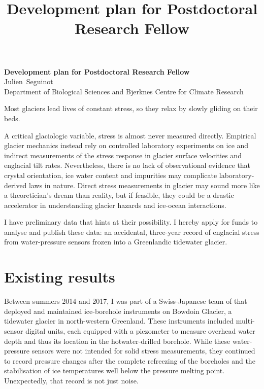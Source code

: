\documentclass{article}
\title{Development plan for Postdoctoral Research Fellow}
\begin{document}
\setlength{\parskip}{0.5\baselineskip}

    \begin{center}
      \textbf{Development plan for Postdoctoral Research Fellow}\\
      Julien~Seguinot \\
      Department of Biological Sciences and
      Bjerknes Centre for Climate Research
    \end{center}

    Most glaciers lead lives of constant stress, so they relax by slowly
    gliding on their beds.

    A critical glaciologic variable, stress is almost never measured directly.
    Empirical glacier mechanics instead rely on controlled laboratory
    experiments on ice and indirect measurements of the stress response in
    glacier surface velocities and englacial tilt rates. Nevertheless, there is
    no lack of observational evidence that crystal orientation, ice water
    content and impurities may complicate laboratory-derived laws in nature.
    Direct stress measurements in glacier may sound more like a theoretician's
    dream than reality, but if feasible, they could be a drastic accelerator in
    understanding glacier hazards and ice-ocean interactions.

    I have preliminary data that hints at their possibility. I hereby apply for
    funds to analyse and publish these data: an accidental, three-year record
    of englacial stress from water-pressure sensors frozen into a Greenlandic
    tidewater glacier.

\section{Existing results}

    Between summers 2014 and 2017, I was part of a Swiss-Japanese team of that
    deployed and maintained ice-borehole instruments on Bowdoin Glacier, a
    tidewater glacier in north-western Greenland. These instruments included
    multi-sensor digital units, each equipped with a piezometer to measure
    overhead water depth and thus its location in the hotwater-drilled
    borehole. While these water-pressure sensors were not intended for solid
    stress measurements, they continued to record pressure changes after the
    complete refreezing of the boreholes and the stabilisation of ice
    temperatures well below the pressure melting point. Unexpectedly, that
    record is not just noise.
\end{document}
